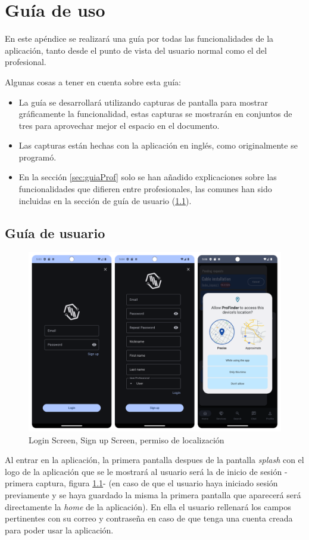 \chapter{Guía de uso}
\label{Appendix:guiaUsuario}
En este apéndice se realizará una guía por todas las funcionalidades de la aplicación, tanto desde el punto de vista del usuario normal como el del profesional.

Algunas cosas a tener en cuenta sobre esta guía: 
\begin{itemize}
    \item La guía se desarrollará utilizando capturas de pantalla para mostrar gráficamente la funcionalidad, estas capturas se mostrarán en conjuntos de tres para aprovechar mejor el espacio en el documento.
    \item Las capturas están hechas con la aplicación en inglés, como originalmente se programó.
    \item En la sección \ref{sec:guiaProf} solo se han añadido explicaciones sobre las funcionalidades que difieren entre profesionales, las comunes han sido incluidas en la sección de guía de usuario (\ref{sec:guiaUser}).
\end{itemize}
 

\section{Guía de usuario}
\label{sec:guiaUser}
\newpage
\begin{figure}[h]
	\centering
	\includegraphics[width = 1\textwidth]{Imagenes/capturasApp/login_signup_local.png}
	\caption{Login Screen, Sign up Screen, permiso de localización}
	\label{fig:capApp1}
\end{figure}
Al entrar en la aplicación, la primera pantalla despues de la pantalla \textit{splash} con el logo de la aplicación que se le mostrará al usuario será la de inicio de sesión -primera captura, figura \ref{fig:capApp1}- (en caso de que el usuario haya iniciado sesión previamente y se haya guardado la misma la primera pantalla que aparecerá será directamente la \textit{home} de la aplicación). En ella el usuario rellenará los campos pertinentes con su correo y contraseña en caso de que tenga una cuenta creada para poder usar la aplicación.

